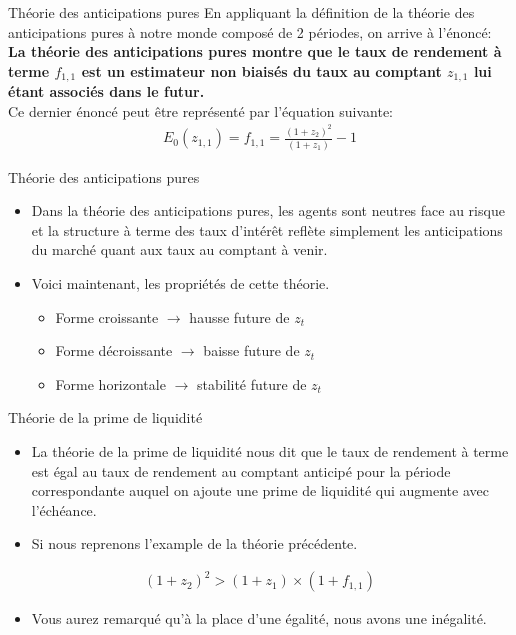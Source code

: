 \documentclass{beamer}
\begin{document}
\begin{frame}{Théorie des anticipations pures}
En appliquant la définition de la théorie des anticipations pures à notre monde composé de 2 périodes, on arrive à l'énoncé: \\
\vspace{0.5cm}
 \textbf{La théorie des anticipations pures montre que le taux de rendement à terme $f_{1,1}$ est un estimateur non biaisés du taux au comptant $z_{1,1}$ lui étant associés dans le futur. }\\
 \vspace{0.5cm}
Ce dernier énoncé peut être représenté par l'équation suivante:
\begin{align*}
E_0(z_{1,1})=f_{1,1}=\frac{(1+z_2)^2}{(1+z_1)}-1
\end{align*}
\end{frame}

\begin{frame}{Théorie des anticipations pures}
\begin{itemize}
\item Dans la théorie des anticipations pures, les agents sont neutres face au risque et la structure à terme des taux d’intérêt reflète simplement les anticipations du marché quant aux taux au comptant à venir. 
\item Voici maintenant,  les propriétés de cette théorie.
\begin{itemize}
\item  Forme croissante $\rightarrow$ hausse future de $z_t$
\item Forme décroissante $\rightarrow$ baisse future de $z_t$
\item Forme horizontale $\rightarrow$ stabilité future de $z_t$
\end{itemize}
\end{itemize}
\end{frame}

\begin{frame}{Théorie de la prime de liquidité}
\begin{itemize}
\item La théorie de la prime de liquidité nous dit que le taux de rendement à terme est égal au taux de rendement au comptant anticipé pour la période correspondante auquel on ajoute une prime de liquidité qui augmente avec l’échéance.  
\item Si nous reprenons l'example de la théorie précédente.
\end{itemize}
\begin{align*}
(1+z_2)^2>(1+z_1) \times (1+f_{1,1})
\end{align*}
\begin{itemize}
\item Vous aurez remarqué qu'à la place d'une égalité, nous avons une inégalité.  
\end{itemize}
\end{frame}
\end{document}
